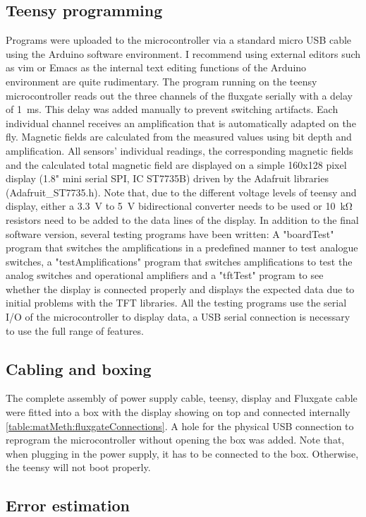         \subsection{Teensy programming}
        Programs were uploaded to the microcontroller via a standard micro USB cable using the Arduino software environment. I recommend using external editors such as vim or Emacs as the internal text editing functions of the Arduino environment are quite rudimentary. The program running on the teensy microcontroller reads out the three channels of the fluxgate serially with a delay of \SI{1}{\milli\second}. This delay was added manually to prevent switching artifacts. Each individual channel receives an amplification that is automatically adapted on the fly. Magnetic fields are calculated from the measured values using bit depth and amplification. All sensors' individual readings, the corresponding magnetic fields and the calculated total magnetic field are displayed on a simple 160x128 pixel display (1.8" mini serial SPI, IC ST7735B) driven by the Adafruit libraries (Adafruit\_ST7735.h). Note that, due to the different voltage levels of teensy and display, either a \SI{3.3}{\volt} to \SI{5}{\volt} bidirectional converter needs to be used or \SI{10}{\kilo\ohm} resistors need to be added to the data lines of the display. In addition to the final software version, several testing programs have been written: A "boardTest" program that switches the amplifications in a predefined manner to test analogue switches, a "testAmplifications" program that switches amplifications to test the analog switches and operational amplifiers and a "tftTest" program to see whether the display is connected properly and displays the expected data due to initial problems with the TFT libraries. All the testing programs use the serial I/O of the microcontroller to display data, a USB serial connection is necessary to use the full range of features.
        \subsection{Cabling and boxing}
        The complete assembly of power supply cable, teensy, display and Fluxgate cable were fitted into a box with the display showing on top and connected internally \ref{table:matMeth:fluxgateConnections}. A hole for the physical USB connection to reprogram the microcontroller without opening the box was added. Note that, when plugging in the power supply, it has to be connected to the box. Otherwise, the teensy will not boot properly.
    \subsection{Error estimation}
